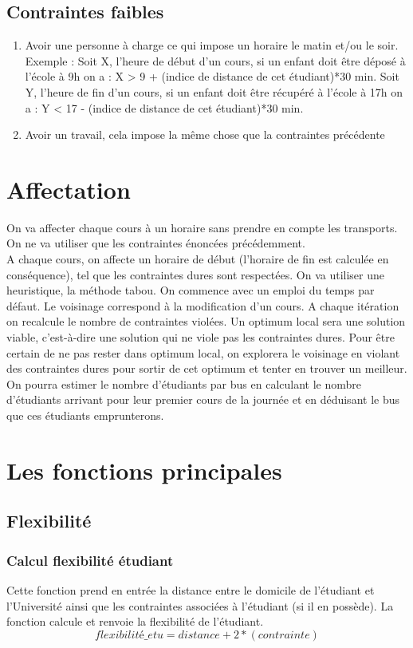 \documentclass[a4paper,11pt]{article}
\begin{document}
	\subsection{Contraintes faibles}
		\begin{enumerate}
			\item Avoir une personne à charge ce qui impose un horaire le matin et/ou le soir. Exemple : Soit X, l'heure de début d'un cours, si un enfant doit être déposé à l'école à 9h on a : X > 9 + (indice de distance de cet étudiant)*30 min. Soit Y, l'heure de fin d'un cours, si un enfant doit être récupéré à l'école à 17h on a : Y < 17 - (indice de distance de cet étudiant)*30 min.
			\item Avoir un travail, cela impose la même chose que la contraintes précédente
		\end{enumerate}
\section{Affectation}
	On va affecter chaque cours à un horaire sans prendre en compte les transports. On ne va utiliser que les contraintes énoncées précédemment. \\
	A chaque cours, on affecte un horaire de début (l'horaire de fin est calculée en conséquence), tel que les contraintes dures sont respectées.
	On va utiliser une heuristique, la méthode tabou. On commence avec un emploi du temps par défaut. Le voisinage correspond à la modification d'un cours. A chaque itération on recalcule le nombre de contraintes violées. Un optimum local sera une solution viable, c'est-à-dire une solution qui ne viole pas les contraintes dures. Pour être certain de ne pas rester dans optimum local, on explorera le voisinage en violant des contraintes dures pour sortir de cet optimum et tenter en trouver un meilleur.\\
	On pourra estimer le nombre d'étudiants par bus en calculant le nombre d'étudiants arrivant pour leur premier cours de la journée et en déduisant le bus que ces étudiants emprunterons.

\section{Les fonctions principales}
	\subsection{Flexibilité}
		\subsubsection{Calcul flexibilité étudiant}
			Cette fonction prend en entrée la distance entre le domicile de l'étudiant et l'Université ainsi que les contraintes associées à l'étudiant (si il en possède). La fonction calcule et renvoie la flexibilité de l'étudiant.
			$$flexibilité\_etu  = distance + 2*(contrainte)$$
\end{document}
